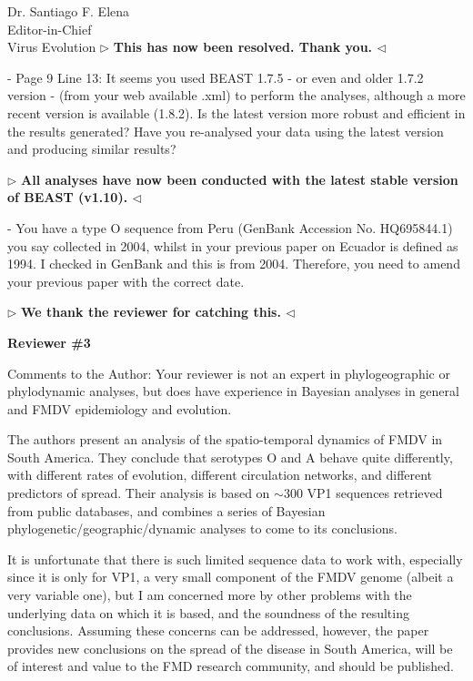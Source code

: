 \documentclass[12pt, a4paper]{letter} %
\newenvironment{reply}{$\triangleright$\bf}{$\triangleleft$}
\begin{document}
\begin{letter}{
	Dr. Santiago F. Elena\\
    Editor-in-Chief \\
    Virus Evolution
}
\begin{reply}
This has now been resolved. Thank you. %
\end{reply}

-       Page 9 Line 13: It seems you used BEAST 1.7.5 - or even and older 1.7.2 version - (from your web available .xml) to perform the analyses, although a more recent version is available (1.8.2). 
Is the latest version more robust and efficient in the results generated? 
Have you re-analysed your data using the latest version and producing similar results?

\begin{reply}
All analyses have now been conducted with the latest stable version of BEAST (v1.10). 
\end{reply}

-       You have a type O sequence from Peru (GenBank Accession No. HQ695844.1) you say collected in 2004, whilst in your previous paper on Ecuador is defined as 1994. 
I checked in GenBank and this is from 2004. 
Therefore, you need to amend your previous paper with the correct date.

\begin{reply}
We thank the reviewer for catching this.
\end{reply}

\textbf{Reviewer \#3}

Comments to the Author: Your reviewer is not an expert in phylogeographic or phylodynamic analyses, but does have experience in Bayesian analyses in general and FMDV epidemiology and evolution.

The authors present an analysis of the spatio-temporal dynamics of FMDV in South America. 
They conclude that serotypes O and A behave quite differently, with different rates of evolution, different circulation networks, and different predictors of spread. 
Their analysis is based on $\sim$300 VP1 sequences retrieved from public databases, and combines a series of Bayesian phylogenetic/geographic/dynamic analyses to come to its conclusions.

It is unfortunate that there is such limited sequence data to work with, especially since it is only for VP1, a very small component of the FMDV genome (albeit a very variable one), but I am concerned more by other problems with the underlying data on which it is based, and the soundness of the resulting conclusions. 
Assuming these concerns can be addressed, however, the paper provides new conclusions on the spread of the disease in South America, will be of interest and value to the FMD research community, and should be published.


\end{letter}
\end{document}
